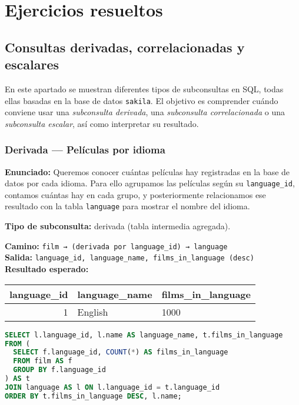 \documentclass[12pt,a4paper]{article}
\begin{document}
\section{Ejercicios resueltos}

\subsection{Consultas derivadas, correlacionadas y escalares}

En este apartado se muestran diferentes tipos de subconsultas en SQL, todas ellas basadas en la base de datos \texttt{sakila}.  
El objetivo es comprender cuándo conviene usar una \emph{subconsulta derivada}, una \emph{subconsulta correlacionada} o una \emph{subconsulta escalar}, 
así como interpretar su resultado.

\subsubsection*{Derivada — Películas por idioma}
\textbf{Enunciado:}  
Queremos conocer cuántas películas hay registradas en la base de datos por cada idioma.  
Para ello agrupamos las películas según su \texttt{language\_id}, contamos cuántas hay en cada grupo, 
y posteriormente relacionamos ese resultado con la tabla \texttt{language} para mostrar el nombre del idioma.  

\textbf{Tipo de subconsulta:} derivada (tabla intermedia agregada).

\textbf{Camino:} \texttt{film → (derivada por language\_id) → language}\\
\textbf{Salida:} \texttt{language\_id, language\_name, films\_in\_language (desc)}\\

\textbf{Resultado esperado:}

\begin{center}
\begin{tabular}{rll}
\toprule
\textbf{language\_id} & \textbf{language\_name} & \textbf{films\_in\_language} \\
\midrule
1 & English & 1000 \\
\bottomrule
\end{tabular}
\end{center}

\begin{lstlisting}[language=SQL]
SELECT l.language_id, l.name AS language_name, t.films_in_language
FROM (
  SELECT f.language_id, COUNT(*) AS films_in_language
  FROM film AS f
  GROUP BY f.language_id
) AS t
JOIN language AS l ON l.language_id = t.language_id
ORDER BY t.films_in_language DESC, l.name;
\end{lstlisting}
\end{document}
